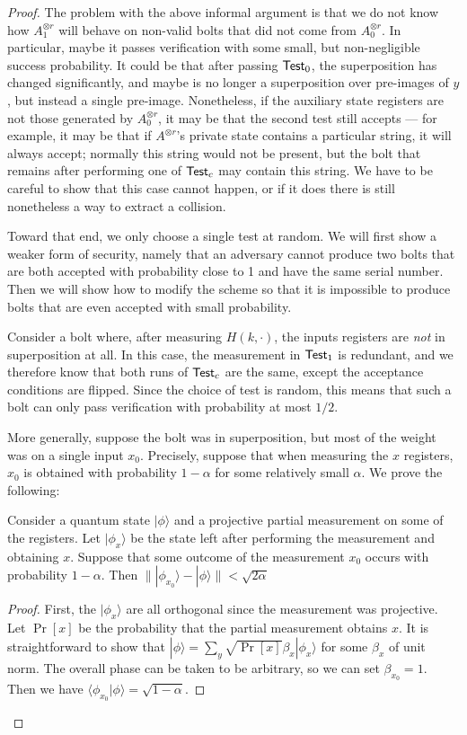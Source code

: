 \begin{proof}
The problem with the above informal argument is that we do not know how $A_1^{\otimes r}$ will behave on non-valid bolts that did not come from $A_0^{\otimes r}$.  In particular, maybe it passes verification with some small, but non-negligible success probability.  It could be that after passing ${\sf Test}_0$, the superposition has changed significantly, and maybe is no longer a superposition over pre-images of $y$, but instead a single pre-image.  Nonetheless, if the auxiliary state registers are not those generated by $A_0^{\otimes r}$, it may be that the second test still accepts  --- for example, it may be that if $A^{\otimes r}$'s private state contains a particular string, it will always accept; normally this string would not be present, but the bolt that remains after performing one of ${\sf Test}_c$ may contain this string.  We have to be careful to show that this case cannot happen, or if it does there is still nonetheless a way to extract a collision.  

Toward that end, we only choose a single test at random.  We will first show a weaker form of security, namely that an adversary cannot produce two bolts that are both accepted with probability close to 1 and have the same serial number.  Then we will show how to modify the scheme so that it is impossible to produce bolts that are even accepted with small probability.

Consider a bolt where, after measuring $H(k,\cdot)$, the inputs registers are \emph{not} in superposition at all.  In this case, the measurement in ${\sf Test}_1$ is redundant, and we therefore know that both runs of ${\sf Test}_c$ are the same, except the acceptance conditions are flipped.  Since the choice of test is random, this means that such a bolt can only pass verification with probability at most $1/2$.  

More generally, suppose the bolt was in superposition, but most of the weight  was on a single input $x_0$.  Precisely, suppose that when measuring the $x$ registers, $x_0$ is obtained with probability $1-\alpha$ for some relatively small $\alpha$.   We prove the following:
\begin{claim}\label{claim:measurement} Consider a quantum state $|\phi\rangle$ and a projective partial measurement on some of the registers.  Let $|\phi_x\rangle$ be the state left after performing the measurement and obtaining $x$.  Suppose that some outcome of the measurement $x_0$ occurs with probability $1-\alpha$.  Then $\||\phi_{x_0}\rangle-|\phi\rangle\| < \sqrt{2\alpha}$
\end{claim}
\begin{proof} First, the $|\phi_x\rangle$ are all orthogonal since the measurement was projective.  Let $\Pr[x]$ be the probability that the partial measurement obtains $x$.  It is straightforward to show that $|\phi\rangle=\sum_y \sqrt{\Pr[x]}\beta_x|\phi_x\rangle$ for some $\beta_x$ of unit norm. The overall phase can be taken to be arbitrary, so we can set $\beta_{x_0}=1$.  Then we have $\langle\phi_{x_0}|\phi\rangle = \sqrt{1-\alpha}$.  
		

\end{proof}
\end{proof}

